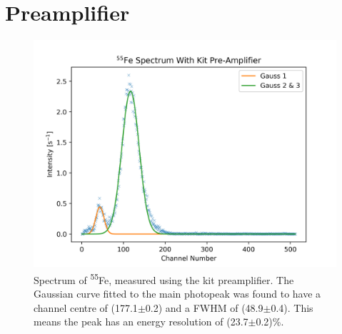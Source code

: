 \section{Preamplifier}

\begin{figure}[H]
  \centering
  \includegraphics[width=\linewidth]{preamplifierSpectrum.png}
  \caption{Spectrum of \textsuperscript{55}Fe, measured using the kit preamplifier. The Gaussian curve fitted to the main photopeak was found to have a channel centre of (177.1$\pm$0.2) and a FWHM of (48.9$\pm$0.4). This means the peak has an energy resolution of (23.7$\pm$0.2)\%.}
  \label{fig:preampSpec}
\end{figure}